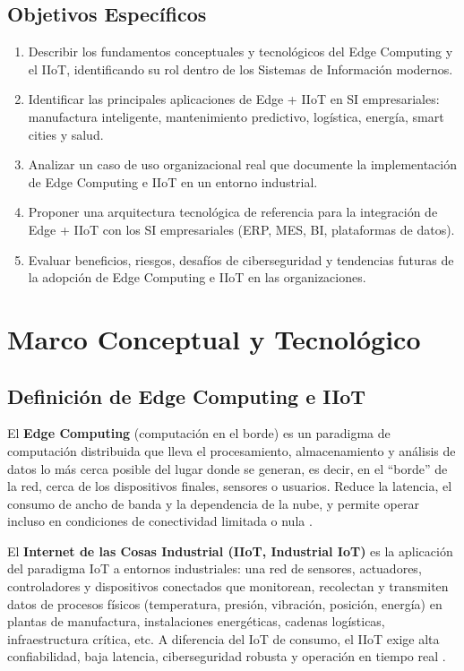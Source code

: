 ﻿\documentclass[12pt,a4paper,oneside]{article}
\begin{document}
\subsection{Objetivos Específicos}

\begin{enumerate}[leftmargin=*]
    \item Describir los fundamentos conceptuales y tecnológicos del Edge Computing y el IIoT, identificando su rol dentro de los Sistemas de Información modernos.
    \item Identificar las principales aplicaciones de Edge + IIoT en SI empresariales: manufactura inteligente, mantenimiento predictivo, logística, energía, smart cities y salud.
    \item Analizar un caso de uso organizacional real que documente la implementación de Edge Computing e IIoT en un entorno industrial.
    \item Proponer una arquitectura tecnológica de referencia para la integración de Edge + IIoT con los SI empresariales (ERP, MES, BI, plataformas de datos).
    \item Evaluar beneficios, riesgos, desafíos de ciberseguridad y tendencias futuras de la adopción de Edge Computing e IIoT en las organizaciones.
\end{enumerate}

\section{Marco Conceptual y Tecnológico}

\subsection{Definición de Edge Computing e IIoT}

El \textbf{Edge Computing} (computación en el borde) es un paradigma de computación distribuida que lleva el procesamiento, almacenamiento y análisis de datos lo más cerca posible del lugar donde se generan, es decir, en el ``borde'' de la red, cerca de los dispositivos finales, sensores o usuarios. Reduce la latencia, el consumo de ancho de banda y la dependencia de la nube, y permite operar incluso en condiciones de conectividad limitada o nula \cite{nistSP800183}.

El \textbf{Internet de las Cosas Industrial (IIoT, Industrial IoT)} es la aplicación del paradigma IoT a entornos industriales: una red de sensores, actuadores, controladores y dispositivos conectados que monitorean, recolectan y transmiten datos de procesos físicos (temperatura, presión, vibración, posición, energía) en plantas de manufactura, instalaciones energéticas, cadenas logísticas, infraestructura crítica, etc. A diferencia del IoT de consumo, el IIoT exige alta confiabilidad, baja latencia, ciberseguridad robusta y operación en tiempo real \cite{nistIR8259}.
\end{document}
